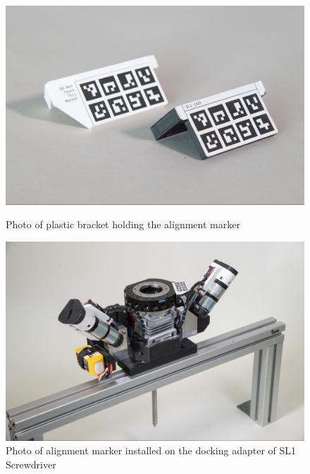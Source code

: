 \begin{figure}[!h]
    \centering
    \begin{minipage}[b]{0.49\textwidth}
        \centering
        \includegraphics[width=\textwidth]{images/7a/img78.jpg}
        \caption{Photo of plastic bracket holding the alignment marker}
        \label{fig:plastic-bracket-holding-the-alignment-marker}
    \end{minipage}
    \hfill
    \begin{minipage}[b]{0.49\textwidth}
        \centering
        \includegraphics[width=\textwidth]{images/7a/img79.jpg}
        \caption{Photo of alignment marker installed on the docking adapter of SL1 Screwdriver}
        \label{fig:alignment-marker-installed-on-sl1-screwdriver}
    \end{minipage}
\end{figure}

